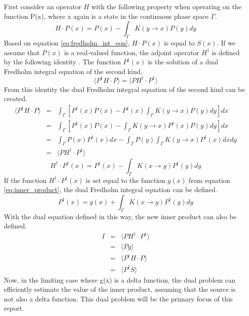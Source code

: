 First consider an operator $H$ with the following property when operating
on the function P(x), where x again is a state in the continuous phase space
$\Gamma$. 
\begin{equation}
  H \cdot P(x) = P(x) - \int_{\Gamma} K(y \to x)P(y)dy
  \label{eq:forward_operator}
\end{equation}
Based on equation \ref{eq:fredholm_int_eqn}, $H \cdot P(x)$ is equal to $S(x)$.
If we assume that $P(x)$ is a real-valued function, the adjoint operator 
$H^{\dagger}$ is defined by the following identity \citep{lewis+miller}. The
function $P^{\dagger}(x)$ is the solution of a dual Fredholm integral equation 
of the second kind. 
\begin{equation}
  \langle P^{\dagger}H \cdot P \rangle = 
  \langle PH^{\dagger} \cdot P^{\dagger} \rangle
  \label{eq:forward_adjoint_ops}
\end{equation}
From this identity the dual Fredholm integral equation of the second kind can
be created.
\begin{eqnarray}
  \langle P^{\dagger}H \cdot P \rangle & = & \int_{\Gamma} \left[P^{\dagger}(x)P(x) -
  P^{\dagger}(x)\int_{\Gamma}K(y \to x)P(y)dy \right]dx \nonumber \\
  & = & \int_{\Gamma} \left[P^{\dagger}(x)P(x) -
  \int_{\Gamma}K(y \to x)P^{\dagger}(x)P(y)dy \right]dx \nonumber \\
  & = & \int_{\Gamma} P(x)P^{\dagger}(x)dx - 
  \int_{\Gamma}P(y)\int_{\Gamma}K(y \to x)P^{\dagger}(x)dxdy \nonumber \\
  & = & \langle PH^{\dagger} \cdot P^{\dagger} \rangle
\end{eqnarray}
\begin{equation}
  H^{\dagger} \cdot P^{\dagger}(x) = P^{\dagger}(x) - 
  \int_{\Gamma}K(x \to y)P^{\dagger}(y)dy
  \label{eq:adjoint_operator}
\end{equation}
If the function $H^{\dagger} \cdot P^{\dagger}(x)$ is set equal to the function
$g(x)$ from equation \ref{eq:inner_product}, the dual Fredholm integral
equation can be defined.
\begin{equation}
  P^{\dagger}(x) = g(x) + \int_{\Gamma}K(x \to y)P^{\dagger}(y)dy
  \label{eq:dual_fredholm_int_eqn}
\end{equation}
With the dual equation defined in this way, the new inner product can also
be defined.
\begin{eqnarray}
  I & = & \langle PH^{\dagger} \cdot P^{\dagger} \rangle \nonumber \\
  & = & \langle Pg \rangle \nonumber \\
  & = & \langle P^{\dagger}H \cdot P \rangle \nonumber \\
  & = & \langle P^{\dagger}S \rangle
\end{eqnarray}
Now, in the limiting case where g(x) is a delta function, the dual problem 
can efficiently estimate the value of the inner product, assuming that the 
source is not also a delta function. This dual problem will be the primary
focus of this report.

